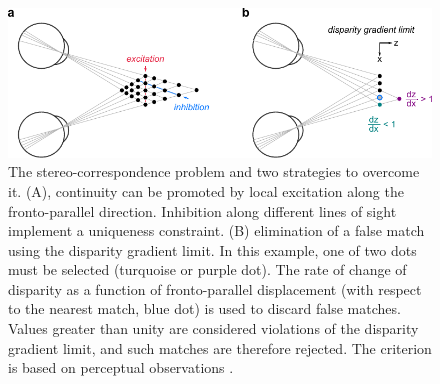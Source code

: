 
\begin{figure}
  \centering
  \includegraphics[width=14cm, keepaspectratio]{corr-problem}
  \caption[The stereo-correspondence problem.]{The stereo-correspondence problem and two strategies to overcome it. (A), continuity can be promoted by local excitation along the fronto-parallel direction. Inhibition along different lines of sight implement a uniqueness constraint. (B) elimination of a false match using the disparity gradient limit. In this example, one of two dots must be selected (turquoise or purple dot). The rate of change of disparity as a function of fronto-parallel displacement (with respect to the nearest match, blue dot) is used to discard false matches. Values greater than unity are considered violations of the disparity gradient limit, and such matches are therefore rejected. The criterion is based on perceptual observations \cite{Burt:1980ys}.}
  \label{fig:correspondence}
\end{figure}

